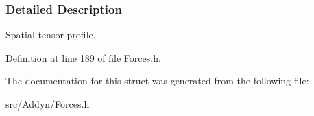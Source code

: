 \subsubsection{\-Detailed \-Description}
\-Spatial tensor profile. 

\-Definition at line 189 of file \-Forces.\-h.



\-The documentation for this struct was generated from the following file\-:\begin{DoxyCompactItemize}
\item 
src/\-Addyn/\-Forces.\-h\end{DoxyCompactItemize}
